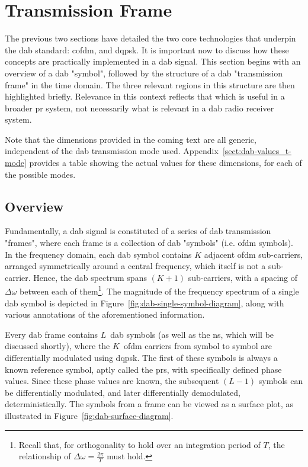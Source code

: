 \documentclass[class=report,11pt,crop=false]{standalone}
\begin{document}
\section{Transmission Frame}
The previous two sections have detailed the two core technologies that underpin the \gls{dab} standard: \gls{cofdm}, and \gls{dqpsk}. It is important now to discuss how these concepts are practically implemented in a \gls{dab} signal. This section begins with an overview of a \gls{dab} "symbol", followed by the structure of a \gls{dab} "transmission frame" in the time domain. The three relevant regions in this structure are then highlighted briefly. Relevance in this context reflects that which is useful in a broader \gls{pr} system, not necessarily what is relevant in a \gls{dab} radio receiver system.

Note that the dimensions provided in the coming text are all generic, independent of the \gls{dab} transmission mode used. Appendix~\ref{sect:dab-values_t-mode} provides a table showing the actual values for these dimensions, for each of the possible modes.

\subsection{Overview}
Fundamentally, a \gls{dab} signal is constituted of a series of \gls{dab} transmission "frames", where each frame is a collection of \gls{dab} "symbols" (i.e. \gls{ofdm} symbols). In the frequency domain, each \gls{dab} symbol contains \(K\) adjacent \gls{ofdm} sub-carriers, arranged symmetrically around a central frequency, which itself is not a sub-carrier. Hence, the \gls{dab} spectrum spans \((K+1)\) sub-carriers, with a spacing of \(\Delta\omega\) between each of them\footnote{Recall that, for orthogonality to hold over an integration period of \(T\), the relationship of  \(\Delta\omega = \frac{2\pi}{T}\) must hold.}. The magnitude of the frequency spectrum of a single \gls{dab} symbol is depicted in Figure~\ref{fig:dab-single-symbol-diagram}, along with various annotations of the aforementioned information.

Every \gls{dab} frame contains \(L\)~\gls{dab} symbols (as well as the \gls{ns}, which will be discussed shortly), where the \(K\)~\gls{ofdm} carriers from symbol to symbol are differentially modulated using \gls{dqpsk}. The first of these symbols is always a known reference symbol, aptly called the \gls{prs}, with specifically defined phase values. Since these phase values are known, the subsequent \((L-1)\) symbols can be differentially modulated, and later differentially demodulated, deterministically. The symbols from a frame can be viewed as a surface plot, as illustrated in Figure~\ref{fig:dab-surface-diagram}.
\end{document}
